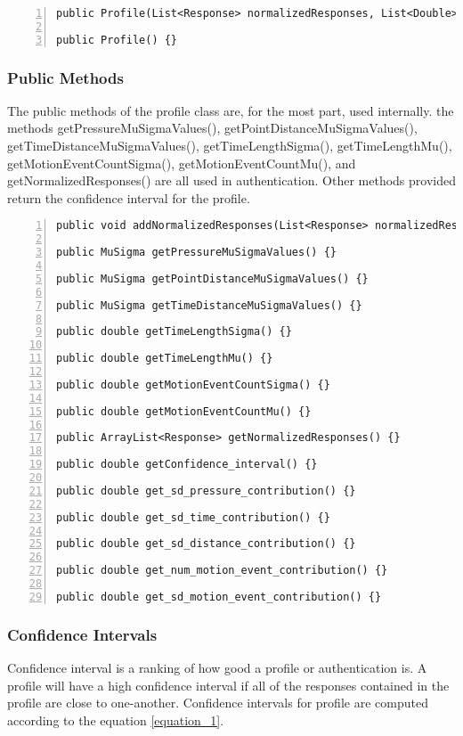 \documentclass{article} %
\begin{document}
\begin{lstlisting}[numbers=left]
public Profile(List<Response> normalizedResponses, List<Double> time_lengths, List<Double> motion_event_counts) {}

public Profile() {}
\end{lstlisting}

\subsubsection{Public Methods}
The public methods of the profile class are, for the most part, used internally.
the methods getPressureMuSigmaValues(), getPointDistanceMuSigmaValues(), getTimeDistanceMuSigmaValues(), getTimeLengthSigma(), getTimeLengthMu(), getMotionEventCountSigma(), getMotionEventCountMu(), and getNormalizedResponses() are all used in authentication.
%
Other methods provided return the confidence interval for the profile.

\begin{lstlisting}[numbers=left]
public void addNormalizedResponses(List<Response> normalizedResponses) {}

public MuSigma getPressureMuSigmaValues() {}

public MuSigma getPointDistanceMuSigmaValues() {}

public MuSigma getTimeDistanceMuSigmaValues() {}

public double getTimeLengthSigma() {}

public double getTimeLengthMu() {}

public double getMotionEventCountSigma() {}

public double getMotionEventCountMu() {}

public ArrayList<Response> getNormalizedResponses() {}

public double getConfidence_interval() {}

public double get_sd_pressure_contribution() {}

public double get_sd_time_contribution() {}

public double get_sd_distance_contribution() {}

public double get_num_motion_event_contribution() {}

public double get_sd_motion_event_contribution() {}
\end{lstlisting}
\subsubsection{Confidence Intervals}
Confidence interval is a ranking of how good a profile or authentication is. 
A profile will have a high confidence interval if all of the responses contained in the profile are close to one-another.
Confidence intervals for profile are computed according to the equation \ref{equation_1}.
\end{document}

